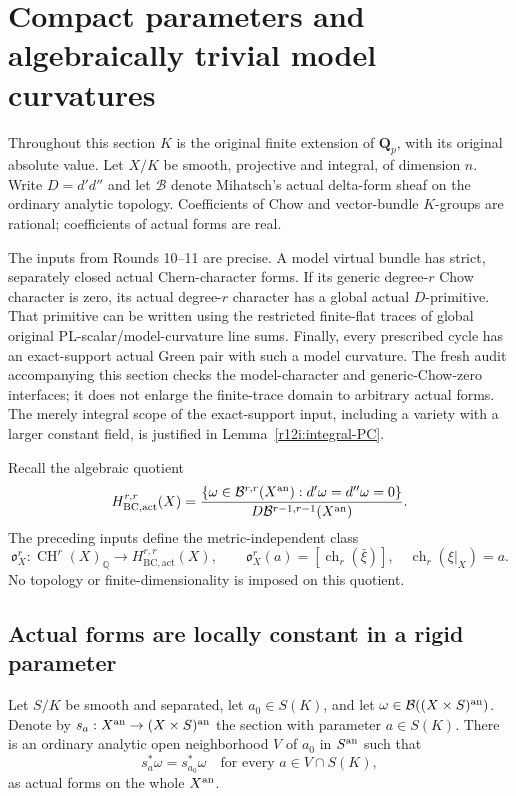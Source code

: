 \section{Compact parameters and algebraically trivial model curvatures}
\label{r12p:section}

Throughout this section $K$ is the original finite extension of
$\mathbf Q_p$, with its original absolute value.  Let $X/K$ be smooth,
projective and integral, of dimension $n$.  Write $D=d'd''$ and let
$\mathcal B$ denote Mihatsch's actual delta-form sheaf on the ordinary
analytic topology.  Coefficients of Chow and vector-bundle $K$-groups
are rational; coefficients of actual forms are real.

The inputs from Rounds 10--11 are precise.  A model virtual bundle has
strict, separately closed actual Chern-character forms.  If its
generic degree-$r$ Chow character is zero, its actual degree-$r$
character has a global actual $D$-primitive.  That primitive can be
written using the restricted finite-flat traces of global original
PL-scalar/model-curvature line sums.  Finally, every prescribed
cycle has an exact-support actual Green pair with such a model
curvature.  The fresh audit accompanying this section checks the
model-character and generic-Chow-zero interfaces; it does not enlarge
the finite-trace domain to arbitrary actual forms.
The merely integral scope of the exact-support input, including a
variety with a larger constant field, is justified in
Lemma~\ref{r12i:integral-PC}.

Recall the algebraic quotient
\[
 H_{\mathrm{BC,act}}^{r,r}(X)=
 \frac{\{\omega\in\mathcal B^{r,r}(X^{\rm an}):
                    d'\omega=d''\omega=0\}}
      {D\mathcal B^{r-1,r-1}(X^{\rm an})}.
\]
The preceding inputs define the metric-independent class
\[
 \mathfrak o_X^r:\operatorname{CH}^r(X)_{\mathbb Q}
       \longrightarrow H_{\mathrm{BC,act}}^{r,r}(X),
 \qquad
 \mathfrak o_X^r(a)=[\operatorname{ch}_r(\bar\xi)],
 \quad \operatorname{ch}_r(\xi|_X)=a.
\tag{R12.P1}\label{r12p:obstruction}
\]
No topology or finite-dimensionality is imposed on this quotient.

\subsection{Actual forms are locally constant in a rigid parameter}

\begin{lemma}
\label{r12p:rigid-fiber}
Let $S/K$ be smooth and separated, let $a_0\in S(K)$, and let
$\omega\in\mathcal B((X\times S)^{\rm an})$.  Denote by
$s_a:X^{\rm an}\to(X\times S)^{\rm an}$ the section with parameter
$a\in S(K)$.  There is an ordinary analytic open neighborhood $V$ of
$a_0$ in $S^{\rm an}$ such that
\[
                    s_a^*\omega=s_{a_0}^*\omega
       \quad\text{for every }a\in V\cap S(K),
\tag{R12.P2}\label{r12p:literal-constancy}
\]
as actual forms on the whole $X^{\rm an}$.
\end{lemma}

